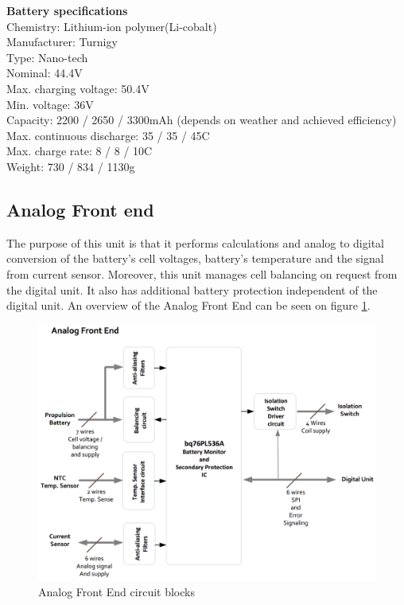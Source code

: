 \textbf{Battery specifications}\\
Chemistry: Lithium-ion polymer(Li-cobalt)\\
Manufacturer: Turnigy\\
Type: Nano-tech\\
Nominal: 44.4V\\
Max. charging voltage: 50.4V\\
Min. voltage: 36V\\
Capacity: 2200 / 2650 / 3300mAh (depends on weather and achieved efficiency)\\
Max. continuous discharge: 35 / 35 / 45C\\
Max. charge rate: 8 / 8 / 10C\\
Weight: 730 / 834 / 1130g\\

\subsection{Analog Front end}
The purpose of this unit is that it performs calculations and analog to digital conversion of the battery's cell voltages, battery's temperature and the signal from current sensor. Moreover, this unit manages cell balancing on request from the digital unit. It also has additional battery protection independent of the digital unit.
An overview of the Analog Front End can be seen on figure \ref{fig:frontendOverview}.

\begin{figure}[H]
	\centering
	\includegraphics[width=1.0\linewidth]{Hardware/Pictures/analogfrontendOverview}
	\caption[Empty]{Analog Front End circuit blocks\footnotemark}
	\label{fig:frontendOverview}
\end{figure}

